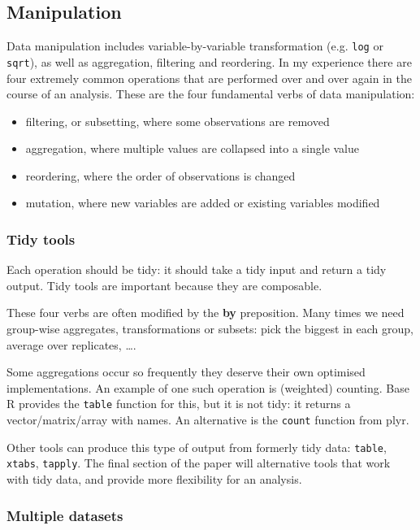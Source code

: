 \documentclass[oneside]{article}
\begin{document}
\subsection{Manipulation}

Data manipulation includes variable-by-variable transformation (e.g. {\tt log} or {\tt sqrt}), as well as aggregation, filtering and reordering. In my experience there are four extremely common operations that are performed over and over again in the course of an analysis. These are the four fundamental verbs of data manipulation:

\begin{itemize}

\item filtering, or subsetting, where some observations are removed
\item aggregation, where multiple values are collapsed into a single value
\item reordering, where the order of observations is changed
\item mutation, where new variables are added or existing variables modified 

\end{itemize}

\subsubsection{Tidy tools}

Each operation should be tidy: it should take a tidy input and return a tidy output. Tidy tools are important because they are composable.

These four verbs are often modified by the \textbf{by} preposition. Many times we need group-wise aggregates, transformations or subsets: pick the biggest in each group, average over replicates, \ldots.  

Some aggregations occur so frequently they deserve their own optimised implementations. An example of one such operation is (weighted) counting. Base R provides the {\tt table} function for this, but it is not tidy: it returns a vector/matrix/array with names. An alternative is the {\tt count} function from plyr.

Other tools can produce this type of output from formerly tidy data: {\tt table}, {\tt xtabs}, {\tt tapply}. The final section of the paper will alternative tools that work with tidy data, and provide more flexibility for an analysis.

\subsubsection{Multiple datasets}
\end{document}
